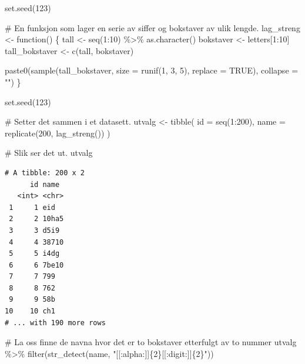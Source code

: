 \documentclass[
  letterpaper,
  DIV=11,
  numbers=noendperiod]{scrreprt}
\newenvironment{Shaded}{\begin{snugshade}}{\end{snugshade}}
\newcommand{\AttributeTok}[1]{\textcolor[rgb]{0.40,0.45,0.13}{#1}}
\newcommand{\CommentTok}[1]{\textcolor[rgb]{0.37,0.37,0.37}{#1}}
\newcommand{\ConstantTok}[1]{\textcolor[rgb]{0.56,0.35,0.01}{#1}}
\newcommand{\ControlFlowTok}[1]{\textcolor[rgb]{0.00,0.23,0.31}{#1}}
\newcommand{\DecValTok}[1]{\textcolor[rgb]{0.68,0.00,0.00}{#1}}
\newcommand{\FunctionTok}[1]{\textcolor[rgb]{0.28,0.35,0.67}{#1}}
\newcommand{\NormalTok}[1]{\textcolor[rgb]{0.00,0.23,0.31}{#1}}
\newcommand{\OtherTok}[1]{\textcolor[rgb]{0.00,0.23,0.31}{#1}}
\newcommand{\SpecialCharTok}[1]{\textcolor[rgb]{0.37,0.37,0.37}{#1}}
\newcommand{\StringTok}[1]{\textcolor[rgb]{0.13,0.47,0.30}{#1}}
\begin{document}
\begin{Shaded}
\begin{Highlighting}[]
\FunctionTok{set.seed}\NormalTok{(}\DecValTok{123}\NormalTok{)}

\CommentTok{\# En funksjon som lager en serie av siffer og bokstaver av ulik lengde.}
\NormalTok{lag\_streng }\OtherTok{\textless{}{-}} \ControlFlowTok{function}\NormalTok{() \{}
\NormalTok{  tall }\OtherTok{\textless{}{-}} \FunctionTok{seq}\NormalTok{(}\DecValTok{1}\SpecialCharTok{:}\DecValTok{10}\NormalTok{) }\SpecialCharTok{\%\textgreater{}\%} \FunctionTok{as.character}\NormalTok{()}
\NormalTok{  bokstaver }\OtherTok{\textless{}{-}}\NormalTok{ letters[}\DecValTok{1}\SpecialCharTok{:}\DecValTok{10}\NormalTok{]}
\NormalTok{  tall\_bokstaver }\OtherTok{\textless{}{-}} \FunctionTok{c}\NormalTok{(tall, bokstaver)}
  
  \FunctionTok{paste0}\NormalTok{(}\FunctionTok{sample}\NormalTok{(tall\_bokstaver, }\AttributeTok{size =} \FunctionTok{runif}\NormalTok{(}\DecValTok{1}\NormalTok{, }\DecValTok{3}\NormalTok{, }\DecValTok{5}\NormalTok{), }\AttributeTok{replace =} \ConstantTok{TRUE}\NormalTok{), }\AttributeTok{collapse =} \StringTok{""}\NormalTok{)}
\NormalTok{\}}

\FunctionTok{set.seed}\NormalTok{(}\DecValTok{123}\NormalTok{)}

\CommentTok{\# Setter det sammen i et datasett.  }
\NormalTok{utvalg }\OtherTok{\textless{}{-}} \FunctionTok{tibble}\NormalTok{(}
  \AttributeTok{id =} \FunctionTok{seq}\NormalTok{(}\DecValTok{1}\SpecialCharTok{:}\DecValTok{200}\NormalTok{), }
  \AttributeTok{name =} \FunctionTok{replicate}\NormalTok{(}\DecValTok{200}\NormalTok{, }\FunctionTok{lag\_streng}\NormalTok{())}
\NormalTok{)}

\CommentTok{\# Slik ser det ut. }
\NormalTok{utvalg}
\end{Highlighting}
\end{Shaded}

\begin{verbatim}
# A tibble: 200 x 2
      id name 
   <int> <chr>
 1     1 eid  
 2     2 10ha5
 3     3 d5i9 
 4     4 38710
 5     5 i4dg 
 6     6 7be10
 7     7 799  
 8     8 762  
 9     9 58b  
10    10 ch1  
# ... with 190 more rows
\end{verbatim}

\begin{Shaded}
\begin{Highlighting}[]
\CommentTok{\# La oss finne de navna hvor det er to bokstaver etterfulgt av to nummer}
\NormalTok{utvalg }\SpecialCharTok{\%\textgreater{}\%} 
  \FunctionTok{filter}\NormalTok{(}\FunctionTok{str\_detect}\NormalTok{(name, }\StringTok{"[[:alpha:]]\{2\}[[:digit:]]\{2\}"}\NormalTok{))}
\end{Highlighting}
\end{Shaded}
\end{document}
